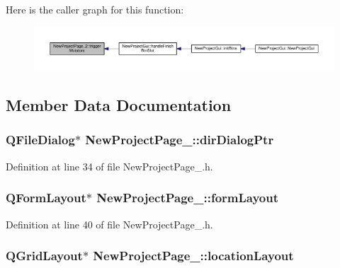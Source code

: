 Here is the caller graph for this function\-:
\nopagebreak
\begin{figure}[H]
\begin{center}
\leavevmode
\includegraphics[width=350pt]{class_new_project_page__2_aedf2995005e1d3e376d34f83a2b064a4_icgraph}
\end{center}
\end{figure}




\subsection{Member Data Documentation}
\hypertarget{class_new_project_page__2_a8cf80ba2a09ce1963365aae0f65a65e7}{
\subsubsection[{dir\-Dialog\-Ptr}]{\setlength{\rightskip}{0pt plus 5cm}Q\-File\-Dialog$\ast$ New\-Project\-Page\-\_\-::dir\-Dialog\-Ptr\hspace{0.3cm}{\ttfamily [private]}}}\label{class_new_project_page__2_a8cf80ba2a09ce1963365aae0f65a65e7}


Definition at line 34 of file New\-Project\-Page\-\_.\-h.

\hypertarget{class_new_project_page__2_afc89c432c8c3cd4740e4a98bbe5f426b}{
\subsubsection[{form\-Layout}]{\setlength{\rightskip}{0pt plus 5cm}Q\-Form\-Layout$\ast$ New\-Project\-Page\-\_\-::form\-Layout\hspace{0.3cm}{\ttfamily [private]}}}\label{class_new_project_page__2_afc89c432c8c3cd4740e4a98bbe5f426b}


Definition at line 40 of file New\-Project\-Page\-\_.\-h.

\hypertarget{class_new_project_page__2_a17fd912b11ae2dad02da7fa3906f948d}{
\subsubsection[{location\-Layout}]{\setlength{\rightskip}{0pt plus 5cm}Q\-Grid\-Layout$\ast$ New\-Project\-Page\-\_\-::location\-Layout\hspace{0.3cm}{\ttfamily [private]}}}\label{class_new_project_page__2_a17fd912b11ae2dad02da7fa3906f948d}


